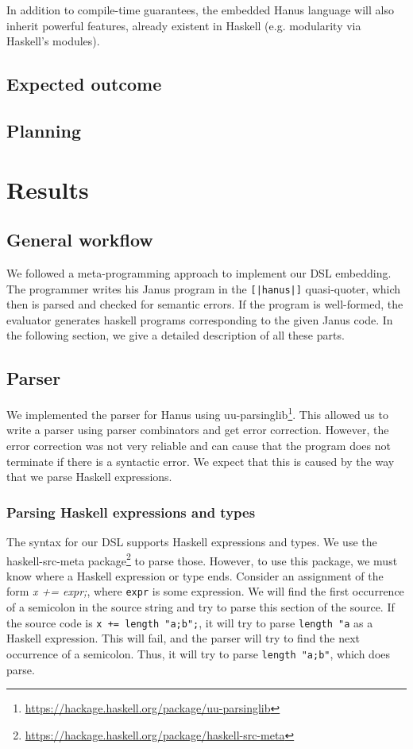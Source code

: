 \documentclass[12pt,a4paper]{article}
\newcommand{\inlinehs}[1]{\texttt{#1}}
\begin{document}
In addition to compile-time guarantees, the embedded Hanus language will also inherit powerful features, already existent in Haskell (e.g. modularity via Haskell's modules).

    \subsection{Expected outcome}
    \subsection{Planning}
\section{Results}
\label{section:results}

\subsection{General workflow}
We followed a meta-programming approach to implement our DSL embedding. The programmer writes his Janus program in the 
\inlinehs{[|hanus|]} quasi-quoter, which then is parsed and checked for semantic errors. If the program is well-formed, the evaluator generates haskell programs corresponding to the given Janus code. In the following section, we give a detailed description of all these parts.

\subsection{Parser}
We implemented the parser for Hanus using uu-parsinglib\footnote{\url{https://hackage.haskell.org/package/uu-parsinglib}}. This allowed us to write a parser using parser combinators and get error correction. However, the error correction was not very reliable and can cause that the program does not terminate if there is a syntactic error. We expect that this is caused by the way that we parse Haskell expressions.

\subsubsection{Parsing Haskell expressions and types}
The syntax for our DSL supports Haskell expressions and types. We use the haskell-src-meta package\footnote{\url{https://hackage.haskell.org/package/haskell-src-meta}} to parse those. However, to use this package, we must know where a Haskell expression or type ends. Consider an assignment of the form \textit{x += expr;}, where \texttt{expr} is some expression. We will find the first occurrence of a semicolon in the source string and try to parse this section of the source. If the source code is \texttt{x += length "a;b";}, it will try to parse \texttt{length "a} as a Haskell expression. This will fail, and the parser will try to find the next occurrence of a semicolon. Thus, it will try to parse \texttt{length "a;b"}, which does parse.
\end{document}
